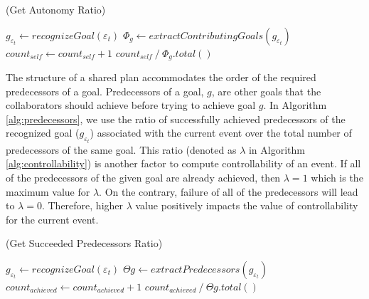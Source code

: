 \documentclass[letterpaper]{article}
\begin{document}
\begin{algorithm}
	\caption{(Get Autonomy Ratio)}
	\label{alg:autonomy}
	\begin{algorithmic}[1]
			\Statex
			\State $\mathit{g}_{\varepsilon_t} \gets \textit{recognizeGoal}{(\varepsilon_t)}$
			\Statex
				\State {}
			\EndIf
			\Statex
			\State $\Phi_{\mathit{g}} \gets
			\textit{extractContributingGoals}{(\mathit{g}_{\varepsilon_t})}$
			\Statex
					\State $count_{self} \gets count_{self} + 1$
				\EndIf
			\EndFor
			\Statex
			\State \Return 
			${count_{self} \mathbin{/} {{\Phi_{\mathit{g}}}.total()}}$
		\EndFunction 
	\end{algorithmic}
\end{algorithm}

The structure of a shared plan accommodates the order of the required
predecessors of a goal. Predecessors of a goal, $g$, are other goals that
the collaborators should achieve before trying to achieve goal $g$. In Algorithm
\ref{alg:predecessors}, we use the ratio of successfully achieved predecessors
of the recognized goal ($\mathit{g}_{\varepsilon_t}$) associated with the
current event over the total number of predecessors of the same goal. This ratio
(denoted as $\lambda$ in Algorithm \ref{alg:controllability}) is another factor
to compute controllability of an event. If all of the predecessors of the given
goal are already achieved, then $\lambda=1$ which is the maximum value for
$\lambda$. On the contrary, failure of all of the predecessors will lead to
$\lambda=0$. Therefore, higher $\lambda$ value positively impacts the value of
controllability for the current event.

\begin{algorithm}
	\caption{(Get Succeeded Predecessors Ratio)}
	\label{alg:predecessors}
	\begin{algorithmic}[1]
			\Statex
			\State $\mathit{g}_{\varepsilon_t} \gets
			\textit{recognizeGoal}{(\varepsilon_t)}$
			\Statex
				\State {}
			\EndIf
			\Statex
			\State $\Theta{\mathit{g}} \gets
			\textit{extractPredecessors}{(\mathit{g}_{\varepsilon_t})}$
			\Statex
					\State $count_{achieved} \gets count_{achieved} + 1$
				\EndIf
			\EndFor
			\Statex
			\State \Return
			${count_{achieved} \mathbin{/} {\Theta{\mathit{g}}.total()}}$
		\EndFunction 
	\end{algorithmic}
\end{algorithm}
\end{document}
